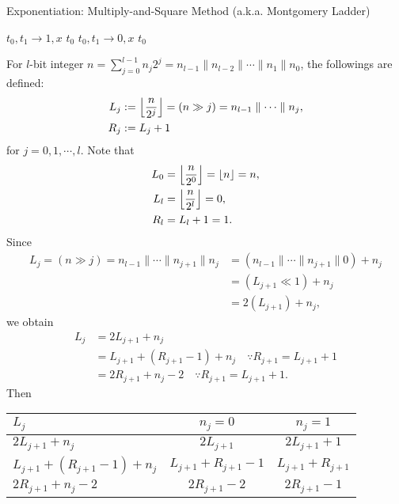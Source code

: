\documentclass[12pt,openany]{book}
\DeclarePairedDelimiter{\floor}{\lfloor}{\rfloor}
\theoremstyle{definition}
\newcommand{\of}[1]{\left( #1 \right)}
\begin{document}
	\begin{algorithm}[H]
		\caption{Exponentiation: Multiply-and-Square Method (a.k.a. Montgomery Ladder)}
		\vspace{8pt}
		\begin{multicols}{2}
			\vspace{8pt}
			$t_0,t_1\to 1,x$\;
			\Return $t_0$\;
			\vspace{8pt}
			\columnbreak %
			\setcounter{AlgoLine}{0}  %
			\vspace{8pt}
			$t_0,t_1\to 0,x$\;
			\Return $t_0$\;
			\vspace{8pt}
		\end{multicols}
		\vspace{8pt}
	\end{algorithm}
	\vspace{8pt}
	For $l$-bit integer $n=\sum_{j=0}^{l-1}n_j2^j=n_{l-1}\parallel n_{l-2}\parallel\cdots\parallel n_{1}\parallel n_0$, the followings are defined: \begin{align*}
	L_j&:=\floor*{\frac{n}{2^j}}=\of{n\gg j}=n_{l-1}\parallel\cdots\parallel n_j,\\
	R_j&:=L_j+1
	\end{align*} for $j=0,1,\cdots, l$. Note that \begin{align*}
	L_0&=\floor*{\frac{n}{2^0}}=\floor*{n}=n,\\
	L_l&=\floor*{\frac{n}{2^l}}=0,\\
	R_l&=L_l+1=1.
	\end{align*} Since \begin{align*}
	L_j=(n\gg j)=n_{l-1}\parallel\cdots\parallel n_{j+1}\parallel n_j&=\of{n_{l-1}\parallel\cdots\parallel n_{j+1}\parallel 0} +n_j\\
	&=\of{L_{j+1}\ll 1}+n_j\\
	&=2\of{L_{j+1}}+n_j,
	\end{align*} we obtain \begin{align*}
	L_j&=2L_{j+1}+n_j\\
	&=L_{j+1}+\of{R_{j+1}-1}+n_j\quad\because R_{j+1}=L_{j+1}+1\\
	&=2{R_{j+1}}+n_j-2\quad\because R_{j+1}=L_{j+1}+1.
	\end{align*} Then \begin{center}
		\begin{tabular}{l||c|c}
			\toprule[1.2pt]
			$L_j$ & $n_j=0$ & $n_j=1$\\
			\midrule
			$2L_{j+1}+n_j$ & $2L_{j+1}$ & $2L_{j+1}+1$\\
			\hline
			$L_{j+1}+\of{R_{j+1}-1}+n_j$ & $L_{j+1}+R_{j+1}-1$ & $L_{j+1}+R_{j+1}$\\
			\hline
			$2{R_{j+1}}+n_j-2$ & $2{R_{j+1}}-2$ & $2{R_{j+1}}-1$\\
			\bottomrule[1.2pt]
		\end{tabular}
	\end{center}
	
\end{document}
